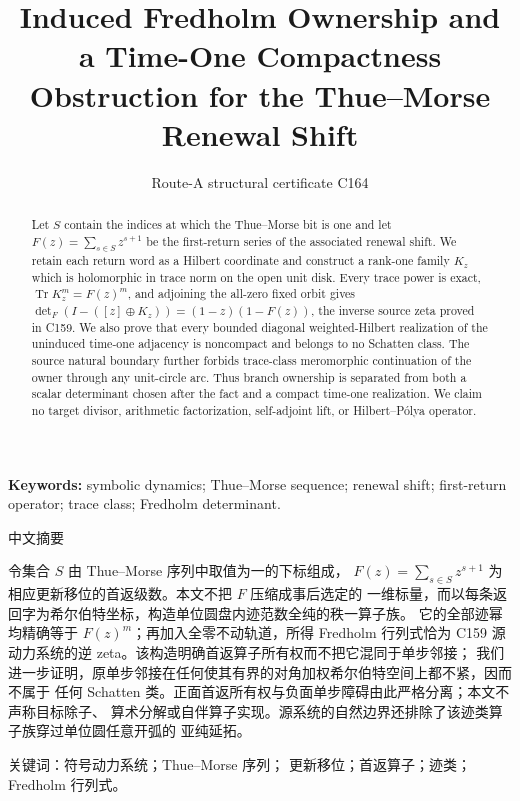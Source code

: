 \documentclass[10pt]{article}
\title{Induced Fredholm Ownership and a Time-One Compactness Obstruction for the Thue--Morse Renewal Shift}
\author{Route-A structural certificate C164}
\date{}
\begin{document}
\maketitle
\begin{abstract}
Let $S$ contain the indices at which the Thue--Morse bit is one and let
$F(z)=\sum_{s\in S}z^{s+1}$ be the first-return series of the associated
renewal shift.  We retain each return word as a Hilbert coordinate and
construct a rank-one family $K_z$ which is holomorphic in trace norm on the
open unit disk.  Every trace power is exact,
$\operatorname{Tr}K_z^m=F(z)^m$, and adjoining the all-zero fixed orbit gives
$\det_F(I-([z]\oplus K_z))=(1-z)(1-F(z))$, the inverse source zeta proved in
C159.  We also prove that every bounded diagonal weighted-Hilbert realization
of the uninduced time-one adjacency is noncompact and belongs to no Schatten
class.  The source natural boundary further forbids trace-class meromorphic
continuation of the owner through any unit-circle arc.  Thus branch ownership
is separated from both a scalar determinant chosen after the fact and a
compact time-one realization.  We claim no target
divisor, arithmetic factorization, self-adjoint lift, or Hilbert--P\'olya
operator.
\end{abstract}
\noindent\textbf{Keywords:} symbolic dynamics; Thue--Morse sequence; renewal
shift; first-return operator; trace class; Fredholm determinant.

\begin{otherlanguage}{chinese-simplified}
\begin{center}{\large 中文摘要}\end{center}
\begin{sloppypar}
令集合 $S$ 由 \foreignlanguage{english}{Thue--Morse} 序列中取值为一的下标组成，
$F(z)=\sum_{s\in S}z^{s+1}$ 为相应更新移位的首返级数。本文不把 $F$ 压缩成事后选定的
一维标量，而以每条返回字为希尔伯特坐标，构造单位圆盘内迹范数全纯的秩一算子族。
它的全部迹幂均精确等于 $F(z)^m$；再加入全零不动轨道，所得
\foreignlanguage{english}{Fredholm} 行列式恰为
\foreignlanguage{english}{C159} 源动力系统的逆 \foreignlanguage{english}{zeta}。该构造明确首返算子所有权而不把它混同于单步邻接；
我们进一步证明，原单步邻接在任何使其有界的对角加权希尔伯特空间上都不紧，因而不属于
任何 \foreignlanguage{english}{Schatten} 类。正面首返所有权与负面单步障碍由此严格分离；本文不声称目标除子、
算术分解或自伴算子实现。源系统的自然边界还排除了该迹类算子族穿过单位圆任意开弧的
亚纯延拓。
\end{sloppypar}
\noindent 关键词：符号动力系统；\foreignlanguage{english}{Thue--Morse} 序列；
更新移位；首返算子；迹类；\foreignlanguage{english}{Fredholm} 行列式。
\end{otherlanguage}
\end{document}
